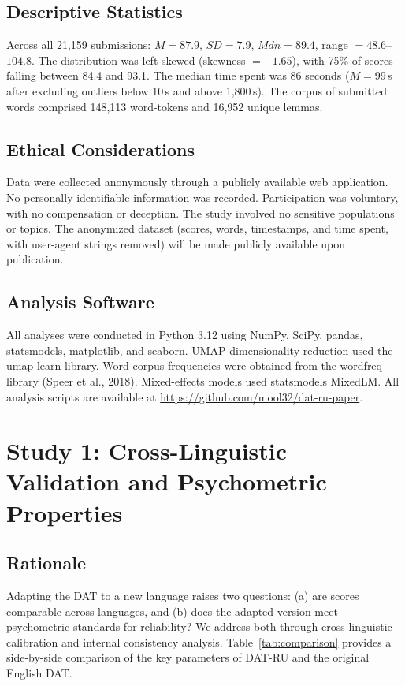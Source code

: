\documentclass[12pt]{article}
\begin{document}
\subsection{Descriptive Statistics}

Across all 21,159 submissions: $M = 87.9$, $SD = 7.9$, $Mdn = 89.4$, range $= 48.6$--$104.8$. The distribution was left-skewed (skewness $= -1.65$), with 75\% of scores falling between 84.4 and 93.1. The median time spent was 86 seconds ($M = 99$\,s after excluding outliers below 10\,s and above 1,800\,s). The corpus of submitted words comprised 148,113 word-tokens and 16,952 unique lemmas.

\subsection{Ethical Considerations}

Data were collected anonymously through a publicly available web application. No personally identifiable information was recorded. Participation was voluntary, with no compensation or deception. The study involved no sensitive populations or topics. The anonymized dataset (scores, words, timestamps, and time spent, with user-agent strings removed) will be made publicly available upon publication.

\subsection{Analysis Software}

All analyses were conducted in Python 3.12 using NumPy, SciPy, pandas, statsmodels, matplotlib, and seaborn. UMAP dimensionality reduction used the umap-learn library. Word corpus frequencies were obtained from the wordfreq library (Speer et al., 2018). Mixed-effects models used statsmodels MixedLM. All analysis scripts are available at \url{https://github.com/mool32/dat-ru-paper}.

\section{Study 1: Cross-Linguistic Validation and Psychometric Properties}

\subsection{Rationale}

Adapting the DAT to a new language raises two questions: (a) are scores comparable across languages, and (b) does the adapted version meet psychometric standards for reliability? We address both through cross-linguistic calibration and internal consistency analysis. Table~\ref{tab:comparison} provides a side-by-side comparison of the key parameters of DAT-RU and the original English DAT.
\end{document}

